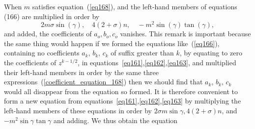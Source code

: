 When \(m\) satisfies equation~(\ref{eq168}), and the left-hand
members of equations (166) are multiplied in order by
\setcounter{equation}{0}
\begin{equation}\label{coefficient_equation_168}
2 m \sigma \sin(\gamma),\quad
4( 2 + \sigma )n,\quad
-m^2 \sin(\gamma) \tan(\gamma),
\end{equation}
and added, the coefficients of \(a_o,b_o,c_o\) vanishes. This remark is
important because the same thing would happen if we formed the equations
like~(\ref{eq166}),
containing no coefficients \(a_k\), \(b_k\), \(c_k\) of suffix greater than
\(k\), by equating to zero the coefficients of \(z^{k-1/2}\),
in equations~\ref{eq161},\ref{eq162},\ref{eq163}, and
multiplied their left-hand members in order
by the same three expressions~(\ref{coefficient_equation_168})
then we should find that
\(a_k\), \(b_k\), \(c_k\)
would all disappear from the equation so formed. It is
therefore convenient to form a new equation from
equations~\ref{eq161},\ref{eq162},\ref{eq163} by multiplying
the left-hand members of these equations in order by
\(2 \sigma m \sin \gamma, 4(2+\sigma) n\), and
\(-m^2 \sin \gamma \tan \gamma\) and adding. We thus obtain the equation

